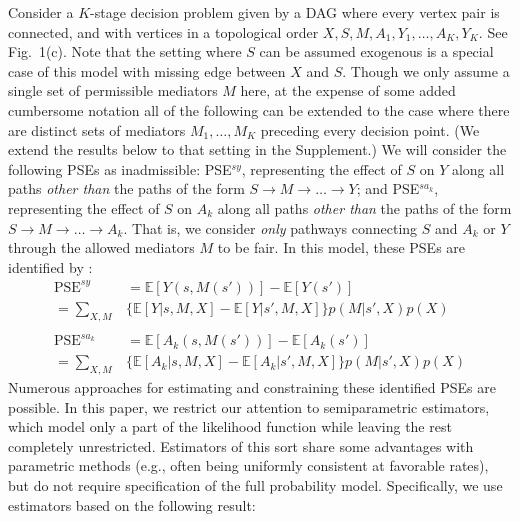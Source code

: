 \documentclass{article}
\newcommand{\E}{\mathbb{E}}
\begin{document}
Consider a $K$-stage decision problem given by a DAG where every vertex pair is connected, and with vertices in a topological order $X, S, M, A_1, Y_1, \ldots, A_K, Y_K$. See Fig.\ 1(c). Note that the setting where $S$ can be assumed exogenous is a special case of this model with missing edge between $X$ and $S$. Though we only assume a single set of permissible mediators $M$ here, at the expense of some added cumbersome notation all of the following can be extended to the case where there are distinct sets of mediators $M_1, \ldots, M_K$ preceding every decision point. (We extend the results below to that setting in the Supplement.)
We will consider the following PSEs as inadmissible: PSE$^{sy}$, representing the effect of $S$ on $Y$ along all paths \emph{other than} the paths of the form $S \to M \to \ldots \to Y$; and PSE$^{sa_k}$, representing the effect of $S$ on $A_k$ along all paths \emph{other than} the paths of the form $S \to M \to \ldots \to A_k$. That is, we consider \emph{only} pathways connecting $S$ and $A_k$ or $Y$ through the allowed mediators $M$ to be fair. 
In this model, these PSEs are identified by \cite{shpitser13cogsci}:
{\small
	\begin{align*}
	\text{PSE}^{sy} 
	&= \E[Y(s,M(s'))] - \E[Y(s')] \\ 
	= \sum_{X,M} &\{ \E[Y | s,M,X] - \E[Y | s',M,X] \} p(M | s',X) p(X)\\ \\
	\text{PSE}^{sa_k} 
	&= \E[A_k(s,M(s'))] - \E[A_k(s')] \\
	= \sum_{X,M} &\{ \E[ A_k | s,M,X] - \E[ A_k | s',M,X] \} p(M | s',X) p(X)
	\end{align*}
}%
Numerous approaches for estimating and constraining these identified PSEs are possible. In this paper, we restrict our attention to semiparametric estimators, which model only a part of the likelihood function while leaving the rest completely unrestricted.  Estimators of this sort share some advantages with parametric methods (e.g., often being uniformly consistent at favorable rates), but do not require specification of the full probability model. Specifically, we use estimators based on the following result:
\end{document}
